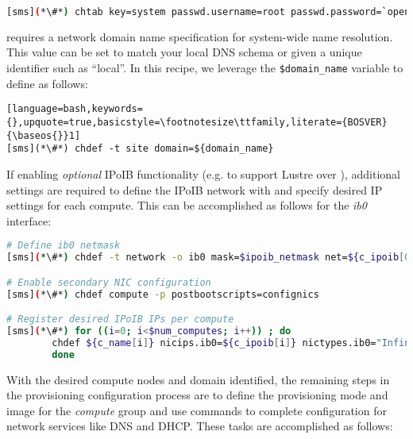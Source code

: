 \begin{lstlisting}[language=bash,keywords={},upquote=true,basicstyle=\footnotesize\ttfamily,]
[sms](*\#*) chtab key=system passwd.username=root passwd.password=`openssl rand -base64 12`
\end{lstlisting}
\fi

\noindent \xCAT{} requires a network domain name specification for system-wide name
resolution. This value can be set to match your local DNS schema or given a
unique identifier such as ``local''. In this recipe, we leverage the
\texttt{\$domain\_name} variable to define as follows:

\begin{lstlisting}[language=bash,keywords={},upquote=true,basicstyle=\footnotesize\ttfamily,literate={BOSVER}{\baseos{}}1]
[sms](*\#*) chdef -t site domain=${domain_name}
\end{lstlisting}

If enabling {\em optional} IPoIB functionality (e.g. to support Lustre over \InfiniBand{}), additional
settings are required to define the IPoIB network with \xCAT{} and specify
desired IP settings for each compute. This can be accomplished as follows for
the {\em ib0} interface:

\begin{lstlisting}[language=bash,keywords={},upquote=true,basicstyle=\footnotesize\ttfamily]
# Define ib0 netmask
[sms](*\#*) chdef -t network -o ib0 mask=$ipoib_netmask net=${c_ipoib[0]}

# Enable secondary NIC configuration
[sms](*\#*) chdef compute -p postbootscripts=confignics

# Register desired IPoIB IPs per compute
[sms](*\#*) for ((i=0; i<$num_computes; i++)) ; do
		chdef ${c_name[i]} nicips.ib0=${c_ipoib[i]} nictypes.ib0="InfiniBand" nicnetworks.ib0=ib0
        done
\end{lstlisting}

With the desired compute nodes and domain identified, the remaining steps in the
provisioning configuration process are to define the provisioning mode and
image for the {\em compute} group and use \xCAT{} commands to complete
configuration for network services like DNS and DHCP. These tasks are
accomplished as follows:


